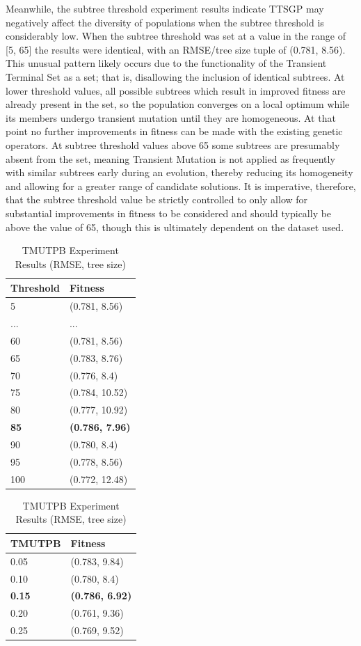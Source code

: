 \documentclass[a4paper, twocolumn]{article}
\begin{document}
Meanwhile, the subtree threshold experiment results indicate TTSGP may negatively affect the diversity of populations when the subtree threshold is considerably low. When the subtree threshold was set at a value in the range of [5, 65] the results were identical, with an RMSE/tree size tuple of (0.781, 8.56). This unusual pattern likely occurs due to the functionality of the Transient Terminal Set as a set; that is, disallowing the inclusion of identical subtrees. At lower threshold values, all possible subtrees which result in improved fitness are already present in the set, so the population converges on a local optimum while its members undergo transient mutation until they are homogeneous. At that point no further improvements in fitness can be made with the existing genetic operators. At subtree threshold values above 65 some subtrees are presumably absent from the set, meaning Transient Mutation is not applied as frequently with similar subtrees early during an evolution, thereby reducing its homogeneity and allowing for a greater range of candidate solutions. It is imperative, therefore, that the subtree threshold value be strictly controlled to only allow for substantial improvements in fitness to be considered and should typically be above the value of 65, though this is ultimately dependent on the dataset used.
\newline
\begin{table}[H]
	\begin{center}
		\caption{Threshold Experiment Results (RMSE, tree size)}
		\label{table:Y}
		\begin{tabularx}{\columnwidth}{X|X}
			Threshold&Fitness\\
			\hline
			5&(0.781, 8.56)\\
			...&...\\
			60&(0.781, 8.56)\\
			65&(0.783, 8.76)\\
			70&(0.776, 8.4)\\
			75&(0.784, 10.52)\\
			80&(0.777, 10.92)\\
			\textbf{85}&\textbf{(0.786, 7.96)}\\
			90&(0.780, 8.4)\\
			95&(0.778, 8.56)\\
			100&(0.772, 12.48)\\
		\end{tabularx}
	\end{center}
	\begin{center}
		\caption{TMUTPB Experiment Results (RMSE, tree size)}
		\label{table:Z}
		\begin{tabularx}{\columnwidth}{X|X}
			TMUTPB&Fitness\\
			\hline
			0.05&(0.783, 9.84)\\
			0.10&(0.780, 8.4)\\
			\textbf{0.15}&\textbf{(0.786, 6.92)}\\
			0.20&(0.761, 9.36)\\
			0.25&(0.769, 9.52)\\
		\end{tabularx}
	\end{center}
\end{table}
\end{document}
